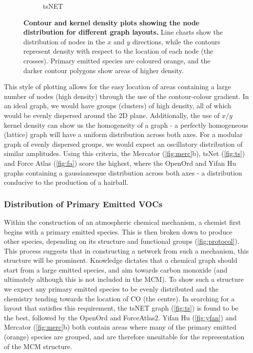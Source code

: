 \begin{figure}[H]
\begin{subfigure}[b]{.49\textwidth}
         \caption{tsNET}
         \label{fig:ts}
     \end{subfigure}
      \hfill
        \caption{ \textbf{Contour and kernel density plots showing the node distribution for different graph layouts.} Line charts show the distribution of nodes in the $x$ and $y$ directions, while the contours represent density with respect to the location of each node (the crosses). Primary emitted species are coloured orange, and the darker contour polygons show areas of higher density.}
        \label{fig:densitycompare}
\end{figure}

This style of plotting allows for the easy location of areas containing a large number of nodes (high density) through the use of the contour-colour gradient. In an ideal graph, we would have groups (clusters) of high density, all of which would be evenly dispersed around the 2D plane.
Additionally, the use of $x/y$ kernel density can show us the homogeneity of a graph - a perfectly homogeneous (lattice) graph will have a uniform distribution across both axes. For a modular graph of evenly dispersed groups, we would expect an oscillatory distribution of similar amplitudes. Using this criteria, the Mercator (\autoref{fig:merc}b), tsNet (\autoref{fig:ts}) and Force Atlas (\autoref{fig:fa}) score the highest, where the OpenOrd and Yifan Hu graphs containing a gaussianesque distribution across both axes - a distribution conducive to the production of a hairball.

\subsubsection{Distribution of Primary Emitted VOCs}

Within the construction of an atmospheric chemical mechanism, a chemist first begins with a primary emitted species. This is then broken down to produce other species, depending on its structure and functional groups (\autoref{fig:protocol}). This process suggests that in constructing a network from such a mechanism, this structure will be prominent. Knowledge dictates that a chemical graph should start from a large emitted species, and aim towards carbon monoxide (and ultimately  although this is not included in the MCM). To show such a structure we expect any primary emitted species to be evenly distributed and the chemistry tending towards the location of CO (the centre). In searching for a layout that satisfies this requirement, the tsNET graph (\autoref{fig:ts}) is found to be the best, followed by the OpenOrd and ForceAtlas2. Yifan Hu (\autoref{fig:yfan}) and Mercator (\autoref{fig:merc}b) both contain areas where many of the primary emitted (orange) species are grouped, and are therefore unsuitable for the representation of the MCM structure.


